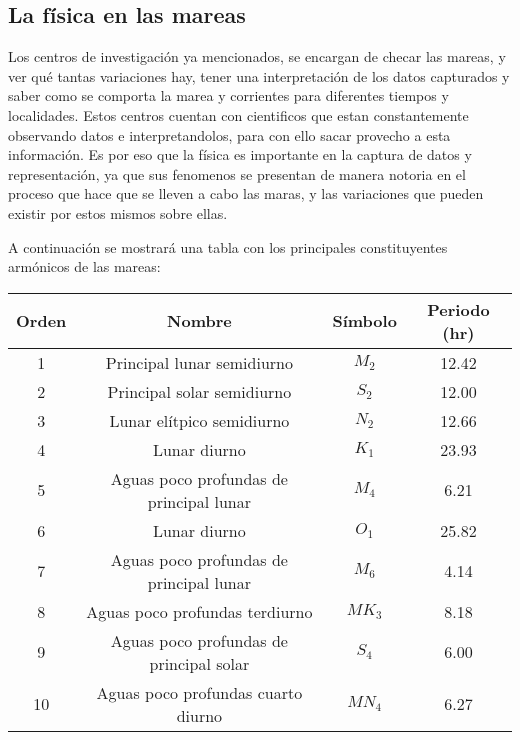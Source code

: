 \documentclass[12pt]{article}
\begin{document}
\subsection{La física en las mareas}
Los centros de investigación ya mencionados, se encargan de checar las mareas, y ver qué tantas variaciones hay, tener una interpretación de los datos capturados y saber como se comporta la marea y corrientes para diferentes tiempos y localidades. Estos centros cuentan con cientificos que estan constantemente observando datos e interpretandolos, para con ello sacar provecho a esta información. Es por eso que la física es importante en la captura de datos y representación, ya que sus fenomenos se presentan de manera notoria en el proceso que hace que se lleven a cabo las maras, y las variaciones que pueden existir por estos mismos sobre ellas. 

A continuación se mostrará una tabla con los principales constituyentes armónicos de las mareas:
\begin{table}[!h]
\begin{center}
\begin{tabular}{||c|c|c|c||}
\hline 
\hline 
\multicolumn{1}{|c|}{Orden} & \multicolumn{1}{|c|}{Nombre} & \multicolumn{1}{|c|}{Símbolo} & \multicolumn{1}{c|}{Periodo (hr)} \\ 
\hline \hline 
1 & Principal lunar semidiurno &  $M_{2}$ & 12.42 \\ \hline
2&  Principal solar semidiurno & $S_{2}$ & 12.00 \\ \hline
3&  Lunar elítpico semidiurno & $N_{2}$ & 12.66 \\ \hline
4&  Lunar diurno & $K_{1}$ & 23.93 \\ \hline
5& Aguas poco profundas de principal lunar & $M_{4}$ & 6.21 \\ \hline
6&  Lunar diurno & $O_{1}$ & 25.82 \\ \hline
7& Aguas poco profundas de principal lunar & $M_{6}$ & 4.14 \\ \hline
8& Aguas poco profundas terdiurno & $MK_{3}$ & 8.18 \\ \hline
9& Aguas poco profundas de principal solar & $S_{4}$ & 6.00 \\ \hline
10& Aguas poco profundas cuarto diurno & $MN_{4}$ & 6.27 \\ \hline

\end{tabular}
\end{center}
\end{table}
\end{document}
